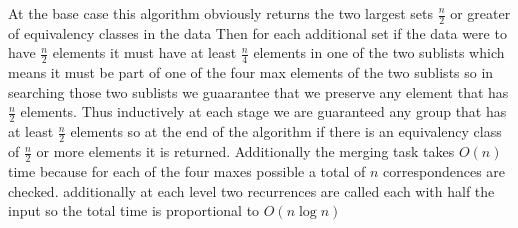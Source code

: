 \documentclass{amsart}
\begin{document}
At the base case this algorithm obviously returns the two largest sets $\frac{n}{2}$ or greater of equivalency classes in the data
Then for each additional set if the data were to have $\frac{n}{2}$ elements  it must have at least $\frac{n}{4}$ elements in one of 
the two sublists which means it must be part of one of the four max elements of the two sublists so in searching those two sublists we guaarantee
that we preserve any element that has $\frac{n}{2}$ elements. Thus inductively at each stage we are guaranteed any group that has at least $\frac{n}{2}$ elements
so at the end of the algorithm if there is an equivalency class of $\frac{n}{2}$ or more elements it is returned. Additionally the merging task takes
$O(n)$ time because for each of the four maxes possible a total of $n$ correspondences are checked. additionally at each level two
recurrences are called each with half the input so the total time is proportional to $O(n\log n)$
\end{document}
